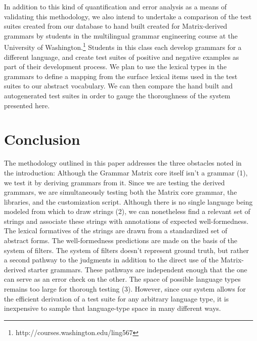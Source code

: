 \documentclass[11pt]{article}
\begin{document}
In addition to this kind of quantification and error analysis as a
means of validating this methodology, we also intend to undertake a
comparison of the test suites created from our database to hand built
created for Matrix-derived grammars by students in the multilingual
grammar engineering course at the University of
Washington.\footnote{http://courses.washington.edu/ling567} Students
in this class each develop grammars for a different language, and
create test suites of positive and negative examples as part of their
development process.  We plan to use the lexical types in the grammars
to define a mapping from the surface lexical items used in the test
suites to our abstract vocabulary.  We can then compare the hand built
and autogenerated test suites in order to gauge the thoroughness of
the system presented here.

\section{Conclusion}

The methodology outlined in this paper addresses the three obstacles
noted in the introduction:  Although the Grammar Matrix core
itself isn't a grammar (1), we test it by deriving grammars from it. Since we
are testing the derived grammars, we are simultaneously testing both
the Matrix core grammar, the libraries, and the customization script.
Although there is no single language being modeled from which to
draw strings (2), we can nonetheless find a relevant set of strings and
associate these strings with annotations of expected well-formedness.  The
lexical formatives of the strings are drawn from a standardized set
of abstract forms.  The well-formedness predictions are made on the basis
of the system of filters.  The system of filters doesn't represent
ground truth, but rather a second pathway to the judgments in 
addition to the direct use of the Matrix-derived starter grammars.
These pathways are independent enough that the one can serve as an
error check on the other.  The space of possible language types
remains too large for thorough testing (3).  However, since our system allows
for the efficient derivation of a test suite for any arbitrary
language type, it is inexpensive to sample that language-type space in
many different ways.


\end{document}
